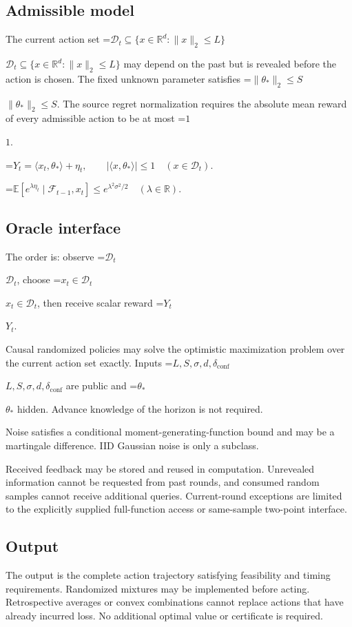 \documentclass[10pt,a4paper]{article}
\newcommand{\AtlasMath}[1]{\par\begingroup\centering\setbox0=\hbox{$\displaystyle #1$}\ifdim\wd0>1.4\linewidth\typeout{ATLAS WIDE FORMULA: \the\wd0}\fi\ifdim\wd0>\linewidth\resizebox{\linewidth}{!}{\box0}\else\box0\fi\par\endgroup}
\newcommand{\AtlasInlineMath}[1]{\begingroup\setbox0=\hbox{$#1$}\ifdim\wd0>.4\linewidth\endgroup\AtlasMath{#1}\else\endgroup$#1$\fi}
\begin{document}
\subsection{Admissible model}
The current action set \AtlasInlineMath{\mathcal{D}_t\subseteq\{x\in\mathbb{R}^d:\|x\|_2\le L\}} may depend on the past but is revealed before the action is chosen. The fixed unknown parameter satisfies \AtlasInlineMath{\|\theta_*\|_2\le S}. The source regret normalization requires the absolute mean reward of every admissible action to be at most \AtlasInlineMath{1}.


\AtlasMath{Y_t=\langle x_t,\theta_*\rangle+\eta_t,\qquad |\langle x,\theta_*\rangle|\le1\quad(x\in\mathcal{D}_t).}



\AtlasMath{\mathbb{E}\!\left[e^{\lambda\eta_t}\mid\mathcal{F}_{t-1},x_t\right]\le e^{\lambda^2\sigma^2/2}\quad(\lambda\in\mathbb{R}).}


\subsection{Oracle interface}
The order is: observe \AtlasInlineMath{\mathcal D_t}, choose \AtlasInlineMath{x_t\in\mathcal D_t}, then receive scalar reward \AtlasInlineMath{Y_t}.

Causal randomized policies may solve the optimistic maximization problem over the current action set exactly. Inputs \AtlasInlineMath{L,S,\sigma,d,\delta_{\mathrm{conf}}} are public and \AtlasInlineMath{\theta_*} hidden. Advance knowledge of the horizon is not required.

Noise satisfies a conditional moment-generating-function bound and may be a martingale difference. IID Gaussian noise is only a subclass.

Received feedback may be stored and reused in computation. Unrevealed information cannot be requested from past rounds, and consumed random samples cannot receive additional queries. Current-round exceptions are limited to the explicitly supplied full-function access or same-sample two-point interface.

\subsection{Output}
The output is the complete action trajectory satisfying feasibility and timing requirements. Randomized mixtures may be implemented before acting. Retrospective averages or convex combinations cannot replace actions that have already incurred loss. No additional optimal value or certificate is required.
\end{document}
